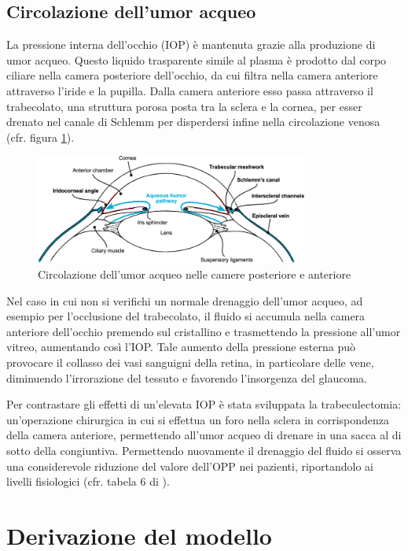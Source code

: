 \documentclass{article}
\begin{document}
\subsection{Circolazione dell'umor acqueo}
La pressione interna dell'occhio (IOP) è mantenuta grazie alla produzione di umor acqueo.
Questo liquido trasparente simile al plasma è prodotto dal corpo ciliare nella camera posteriore dell'occhio, da cui filtra nella camera anteriore attraverso l'iride e la pupilla.
Dalla camera anteriore esso passa attraverso il trabecolato, una struttura porosa posta tra la sclera e la cornea, per esser drenato nel canale di Schlemm per disperdersi infine nella circolazione venosa (cfr. figura \ref{umoracqueo}).
\begin{figure}[h]
\begin{center}
\includegraphics[width=0.8\textwidth]{Pictures/umor_acqueo.png}
\caption{Circolazione dell'umor acqueo nelle camere posteriore e anteriore \cite{Tesimmagine}}
\label{umoracqueo}
\end{center}
\end{figure}
Nel caso in cui non si verifichi un normale drenaggio dell'umor acqueo, ad esempio per l'occlusione del trabecolato, il fluido si accumula nella camera anteriore dell'occhio premendo sul cristallino e trasmettendo la pressione all'umor vitreo, aumentando così l'IOP.
Tale aumento della pressione esterna può provocare il collasso dei vasi sanguigni della retina, in particolare delle vene, diminuendo l'irrorazione  del tessuto e favorendo l'insorgenza del glaucoma.

Per contrastare gli effetti di un'elevata IOP è stata sviluppata la trabeculectomia: un'operazione chirurgica in cui si effettua un foro nella sclera in corrispondenza della camera anteriore, permettendo all'umor acqueo di drenare in una sacca al di sotto  della congiuntiva.
Permettendo nuovamente il drenaggio del fluido si osserva una considerevole riduzione del valore dell'OPP nei pazienti, riportandolo ai livelli fisiologici (cfr. tabela 6 di \cite{art1}).

\section{Derivazione del modello}
\end{document}
